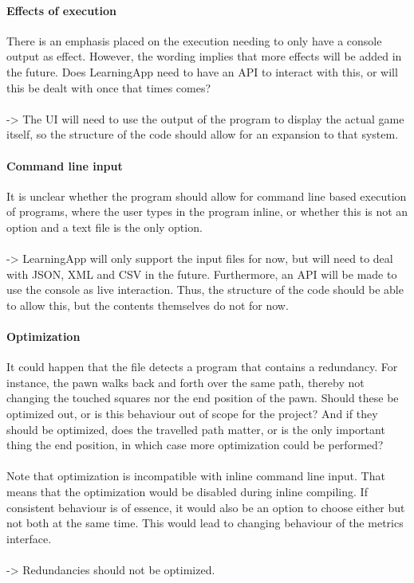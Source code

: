 \paragraph{Effects of execution}
There is an emphasis placed on the execution needing to only have a console output as effect. However, the wording implies that more effects will be added in the future. Does LearningApp need to have an API to interact with this, or will this be dealt with once that times comes?\\~\\
-> The UI will need to use the output of the program to display the actual game itself, so the structure of the code should allow for an expansion to that system. 

\paragraph{Command line input}
It is unclear whether the program should allow for command line based execution of programs, where the user types in the program inline, or whether this is not an option and a text file is the only option. \\~\\
-> LearningApp will only support the input files for now, but will need to deal with JSON, XML and CSV in the future. Furthermore, an API will be made to use the console as live interaction. Thus, the structure of the code should be able to allow this, but the contents themselves do not for now.

\paragraph{Optimization}
It could happen that the file detects a program that contains a redundancy. For instance, the pawn walks back and forth over the same path, thereby not changing the touched squares nor the end position of the pawn. Should these be optimized out, or is this behaviour out of scope for the project? And if they should be optimized, does the travelled path matter, or is the only important thing the end position, in which case more optimization could be performed?\\~\\
Note that optimization is incompatible with inline command line input. That means that the optimization would be disabled during inline compiling. If consistent behaviour is of essence, it would also be an option to choose either but not both at the same time. This would lead to changing behaviour of the metrics interface.\\~\\
-> Redundancies should not be optimized. 

